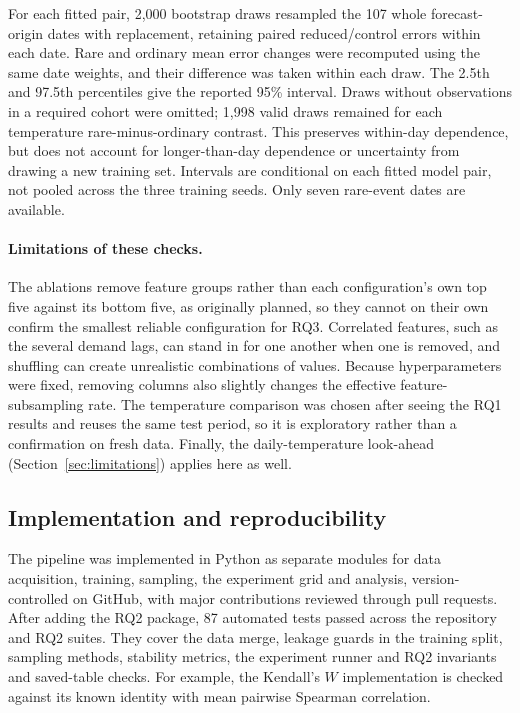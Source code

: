 \documentclass[11pt,a4paper]{article}
\begin{document}
For each fitted pair, 2{,}000 bootstrap draws resampled the 107 whole forecast-origin dates with replacement, retaining paired reduced/control errors within each date. Rare and ordinary mean error changes were recomputed using the same date weights, and their difference was taken within each draw. The 2.5th and 97.5th percentiles give the reported 95\% interval. Draws without observations in a required cohort were omitted; 1{,}998 valid draws remained for each temperature rare-minus-ordinary contrast. This preserves within-day dependence, but does not account for longer-than-day dependence or uncertainty from drawing a new training set. Intervals are conditional on each fitted model pair, not pooled across the three training seeds. Only seven rare-event dates are available.

\paragraph{Limitations of these checks.}
The ablations remove feature groups rather than each configuration's own top five against its bottom five, as originally planned, so they cannot on their own confirm the smallest reliable configuration for RQ3. Correlated features, such as the several demand lags, can stand in for one another when one is removed, and shuffling can create unrealistic combinations of values. Because hyperparameters were fixed, removing columns also slightly changes the effective feature-subsampling rate. The temperature comparison was chosen after seeing the RQ1 results and reuses the same test period, so it is exploratory rather than a confirmation on fresh data. Finally, the daily-temperature look-ahead (Section~\ref{sec:limitations}) applies here as well.

\subsection{Implementation and reproducibility}\label{sec:implementation}

The pipeline was implemented in Python as separate modules for data acquisition, training, sampling, the experiment grid and analysis, version-controlled on GitHub, with major contributions reviewed through pull requests. After adding the RQ2 package, 87 automated tests passed across the repository and RQ2 suites. They cover the data merge, leakage guards in the training split, sampling methods, stability metrics, the experiment runner and RQ2 invariants and saved-table checks. For example, the Kendall's $W$ implementation is checked against its known identity with mean pairwise Spearman correlation.
\end{document}
